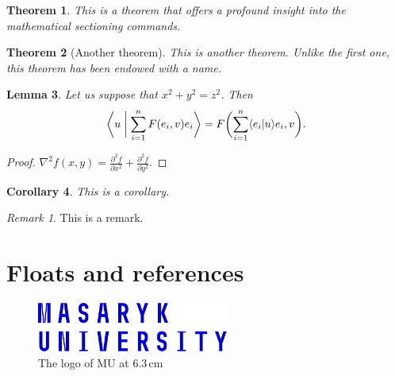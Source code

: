 \documentclass[
  digital,     %
  oneside,     %
  nosansbold,  %
  nocolorbold, %
  lof,         %
  lot,         %
]{fithesis4}
\begin{document}
\newtheorem{theorem}{Theorem}[section] %
\newtheorem{lemma}[theorem]{Lemma}         %
\newtheorem{corollary}[theorem]{Corollary} %
\theoremstyle{definition}
\newtheorem{definition}{Definition}
\theoremstyle{remark}
\newtheorem*{remark}{Remark}

\begin{theorem}
  This is a theorem that offers a profound insight into the
  mathematical sectioning commands.
\end{theorem}
\begin{theorem}[Another theorem]
  This is another theorem. Unlike the first one, this theorem has
  been endowed with a name.
\end{theorem}
\begin{lemma}
  Let us suppose that $x^2+y^2=z^2$. Then
  \begin{equation}
    \biggl\langle u\biggm|\sum_{i=1}^nF(e_i,v)e_i\biggr\rangle
    =F\biggl(\sum_{i=1}^n\langle e_i|u\rangle e_i,v\biggr).
  \end{equation}
\end{lemma}
\begin{proof}
  $\nabla^2 f(x,y)=\frac{\partial^2f}{\partial x^2}+
   \frac{\partial^2f}{\partial y^2}$.
\end{proof}
\begin{corollary}
  This is a corollary.
\end{corollary}
\begin{remark}
  This is a remark.
\end{remark}

\chapter{Floats and references}
\begin{figure}
  \begin{center}
    \includegraphics[width=6.3cm]{fithesis/logo/mu/fithesis-base-english-color}
  \end{center}
  \caption{The logo of \acrlong{MU} at 6.3\,cm}
  \label{fig:mulogo1}
\end{figure}
\end{document}

